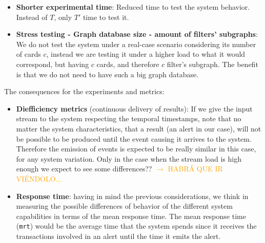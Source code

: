 \documentclass[12pt,a4paper]{article}
\begin{document}
\begin{itemize}
  \item \textbf{Shorter experimental time}: Reduced time to test the system behavior. Instead of $T$, only $T'$ time to test it. 
  \item \textbf{Stress testing - Graph database size - amount of filters' subgraphs}: We do not test the system under a real-case scenario considering its number of cards $c$, instead we are testing it under a higher load to what it would correspond, but having $c$ cards, and therefore $c$ filter's subgraph. The benefit is that we do not need to have such a big graph database.
\end{itemize}

The consequences for the experiments and metrics:

\begin{itemize}
  \item \textbf{Diefficiency metrics} (continuous delivery of results): If we give the input stream to the system respecting the temporal timestamps, note that no matter the system characteristics, that a result (an alert in our case), will not be possible to be produced until the event causing it arrives to the system. Therefore the emission of events is expected to be really similar in this case, for any system variation. Only in the case when the stream load is high enough we expect to see some differences?? \textcolor{orange}{$\rightarrow$ HABRÁ QUE IR VIÉNDOLO...}
  \item \textbf{Response time}: having in mind the previous considerations, we think in measuring the possible differences of behavior of the different system capabilities in terms of the mean response time. The mean response time (\texttt{mrt}) would be the average time that the system spends since it receives the transactions involved in an alert until the time it emits the alert.
\end{itemize}
\end{document}
